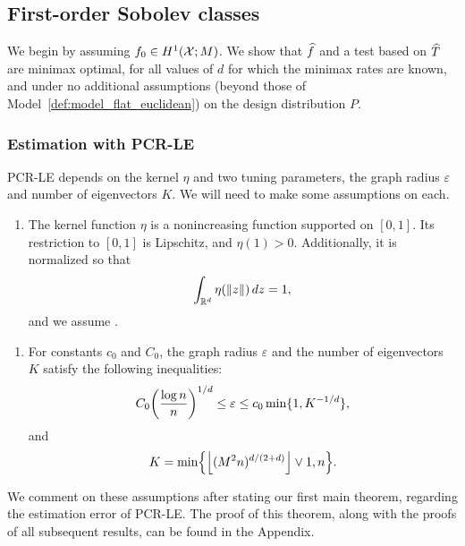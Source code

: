 \subsection{First-order Sobolev classes}
\label{sec:first_order_sobolev_classes}
We begin by assuming $f_0 \in H^1(\mathcal{X}; M)$. We show that $\widehat{f}$ and a test based on $\widehat{T}$ are minimax optimal, for all values of $d$ for which the minimax rates are known, and under no additional assumptions (beyond those of Model~\ref{def:model_flat_euclidean}) on the design distribution $P$.

\subsubsection{Estimation with PCR-LE} 
PCR-LE depends on the kernel $\eta$ and two tuning parameters, the graph radius $\varepsilon$ and number of eigenvectors $K$. We will need to make some assumptions on each.
\begin{enumerate}[label=(K\arabic*)]
	\setcounter{enumi}{0}
	\item
	\label{asmp:kernel_flat_euclidean}
	The kernel function $\eta$ is a nonincreasing function supported on $[0,1]$. Its restriction to $[0,1]$ is Lipschitz, and $\eta(1) > 0$. Additionally, it is normalized so that
	\begin{equation*}
	\int_{\mathbb{R}^d} \eta(\|z\|) \,dz = 1,
	\end{equation*}
	and we assume .
\end{enumerate}
\begin{enumerate}[label=(P\arabic*)]
	\setcounter{enumi}{0}
	\item 
	\label{asmp:parameters_estimation_fo} 
	For constants $c_0$ and $C_0$, the graph radius $\varepsilon$ and the number of eigenvectors $K$ satisfy the following inequalities:
	\begin{equation}\\
	\label{eqn:radius_fo} 
	C_0\biggl(\frac{\log n}{n}\biggr)^{1/d} \leq \varepsilon \leq c_0\min\{1,K^{-1/d}\},
	\end{equation}
	and 
	\begin{equation}
	\label{eqn:eigenvector_estimation_fo} 
	K = \min\Bigl\{\left\lfloor (M^2n)^{d/(2 + d)} \right\rfloor \vee 1, n\Bigr\}.
	\end{equation}
\end{enumerate}
We comment on these assumptions after stating our first main theorem, regarding the estimation error of PCR-LE. The proof of this theorem, along with the proofs of all subsequent results, can be found in the Appendix.
